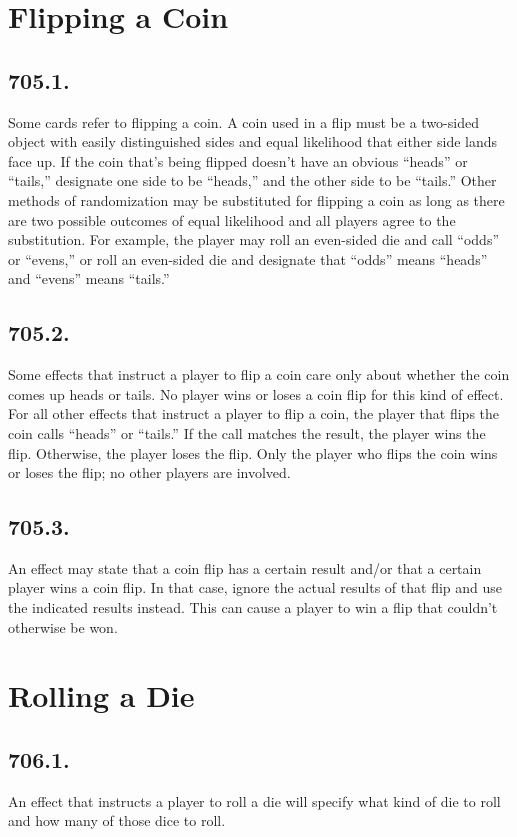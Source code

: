 \section{Flipping a Coin}
\subsection*{705.1.}
Some cards refer to flipping a coin. A coin used in a flip must be a two-sided object with easily distinguished sides and equal likelihood that either side lands face up. If the coin that’s being flipped doesn’t have an obvious “heads” or “tails,” designate one side to be “heads,” and the other side to be “tails.” Other methods of randomization may be substituted for flipping a coin as long as there are two possible outcomes of equal likelihood and all players agree to the substitution. For example, the player may roll an even-sided die and call “odds” or “evens,” or roll an even-sided die and designate that “odds” means “heads” and “evens” means “tails.”

\subsection*{705.2.}
Some effects that instruct a player to flip a coin care only about whether the coin comes up heads or tails. No player wins or loses a coin flip for this kind of effect. For all other effects that instruct a player to flip a coin, the player that flips the coin calls “heads” or “tails.” If the call matches the result, the player wins the flip. Otherwise, the player loses the flip. Only the player who flips the coin wins or loses the flip; no other players are involved.

\subsection*{705.3.}
An effect may state that a coin flip has a certain result and/or that a certain player wins a coin flip. In that case, ignore the actual results of that flip and use the indicated results instead. This can cause a player to win a flip that couldn’t otherwise be won.

\section{Rolling a Die}
\subsection*{706.1.}
An effect that instructs a player to roll a die will specify what kind of die to roll and how many of those dice to roll.

